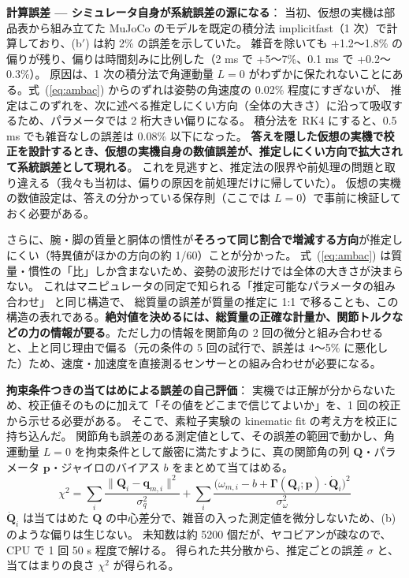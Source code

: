 \documentclass[paper=a4paper,fontsize=10pt,twocolumn,column_gap=2zw,line_length=24zw,number_of_lines=46,head_space=20mm]{jlreq}
\begin{document}
\textbf{計算誤差 --- シミュレータ自身が系統誤差の源になる}：
当初、仮想の実機は部品表から組み立てた MuJoCo のモデルを既定の積分法 implicitfast（1 次）で計算しており、(b$'$) は約 2\% の誤差を示していた。
雑音を除いても +1.2〜1.8\% の偏りが残り、偏りは時間刻みに比例した（2 ms で +5〜7\%、0.1 ms で +0.2〜0.3\%）。
原因は、1 次の積分法で角運動量 $L=0$ がわずかに保たれないことにある。式~(\ref{eq:ambac}) からのずれは姿勢の角速度の 0.02\% 程度にすぎないが、
推定はこのずれを、次に述べる推定しにくい方向（全体の大きさ）に沿って吸収するため、パラメータでは 2 桁大きい偏りになる。
積分法を RK4 にすると、0.5 ms でも雑音なしの誤差は 0.08\% 以下になった。
\textbf{答えを隠した仮想の実機で校正を設計するとき、仮想の実機自身の数値誤差が、推定しにくい方向で拡大されて系統誤差として現れる}。
これを見逃すと、推定法の限界や前処理の問題と取り違える（我々も当初は、偏りの原因を前処理だけに帰していた）。
仮想の実機の数値設定は、答えの分かっている保存則（ここでは $L=0$）で事前に検証しておく必要がある。

さらに、腕・脚の質量と胴体の慣性が\textbf{そろって同じ割合で増減する方向}が推定しにくい（特異値がほかの方向の約 1/60）ことが分かった。
式~(\ref{eq:ambac}) は質量・慣性の「比」しか含まないため、姿勢の波形だけでは全体の大きさが決まらない。
これはマニピュレータの同定で知られる「推定可能なパラメータの組み合わせ」\cite{gautier1990} と同じ構造で、
総質量の誤差が質量の推定に 1:1 で移ることも、この構造の表れである。\textbf{絶対値を決めるには、総質量の正確な計量か、関節トルクなどの力の情報が要る}。ただし力の情報を関節角の 2 回の微分と組み合わせると、上と同じ理由で偏る（元の条件の 5 回の試行で、誤差は 4〜5\% に悪化した）ため、速度・加速度を直接測るセンサーとの組み合わせが必要になる。

\textbf{拘束条件つきの当てはめによる誤差の自己評価}：
実機では正解が分からないため、校正値そのものに加えて「その値をどこまで信じてよいか」を、1 回の校正から示せる必要がある。
そこで、素粒子実験の kinematic fit \cite{avery1998} の考え方を校正に持ち込んだ。
関節角も誤差のある測定値として、その誤差の範囲で動かし、角運動量 $L=0$ を拘束条件として厳密に満たすように、真の関節角の列 $\bm Q$・パラメータ $\bm p$・ジャイロのバイアス $b$ をまとめて当てはめる。
{\small\begin{equation}
\chi^2=\sum_i\frac{\|\bm Q_i-\bm q_{m,i}\|^2}{\sigma_q^2}+\sum_i\frac{\bigl(\omega_{m,i}-b+\bm\Gamma(\bm Q_i;\bm p)\cdot\dot{\bm Q}_i\bigr)^2}{\sigma_\omega^2}
\label{eq:kinfit}
\end{equation}}
$\dot{\bm Q}_i$ は当てはめた $\bm Q$ の中心差分で、雑音の入った測定値を微分しないため、(b) のような偏りは生じない。
未知数は約 5200 個だが、ヤコビアンが疎なので、CPU で 1 回 50 s 程度で解ける。
得られた共分散から、推定ごとの誤差 $\sigma$ と、当てはまりの良さ $\chi^2$ が得られる。
\end{document}
